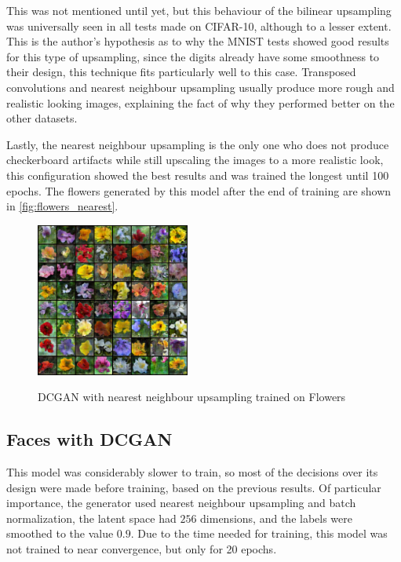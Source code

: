 This was not mentioned until yet, but this behaviour of the bilinear upsampling was universally seen in all tests made on \gls{CIFAR}-10, although to a lesser extent. This is the author's hypothesis as to why the \gls{MNIST} tests showed good results for this type of upsampling, since the digits already have some smoothness to their design, this technique fits particularly well to this case. Transposed convolutions and nearest neighbour upsampling usually produce more rough and realistic looking images, explaining the fact of why they performed better on the other datasets.

Lastly, the nearest neighbour upsampling is the only one who does not produce checkerboard artifacts while still upscaling the images to a more realistic look, this configuration showed the best results and was trained the longest until 100 epochs. The flowers generated by this model after the end of training are shown in \autoref{fig:flowers_nearest}.
\begin{figure}[hbt]
    \centering
    \caption{DCGAN with nearest neighbour upsampling trained on Flowers}
    \includegraphics[width=0.45\textwidth]{chapters/Experiments/Other/flowers_nearest.png}
    \label{fig:flowers_nearest}
\end{figure}

\subsection{Faces with DCGAN}
This model was considerably slower to train, so most of the decisions over its design were made before training, based on the previous results. Of particular importance, the generator used nearest neighbour upsampling and batch normalization, the latent space had $256$ dimensions, and the labels were smoothed to the value $0.9$. Due to the time needed for training, this model was not trained to near convergence, but only for 20 epochs.

